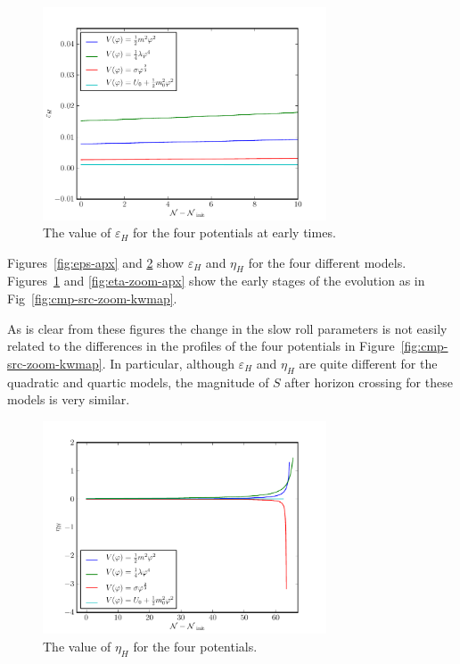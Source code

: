\begin{figure}
 \centering
 \includegraphics[width=0.75\textwidth]{numerical/graphs/epsilon_slowroll_zoom-large.pdf}
 \caption[Value of $\varepsilon_H$ for the Four Potentials at Early Times]{The value of
$\varepsilon_H$ for the four potentials at early times.}
 \label{fig:eps-zoom-apx}
\end{figure}

Figures~\ref{fig:eps-apx} and \ref{fig:eta-apx} show $\varepsilon_H$ and $\eta_H$ for the
four different models. Figures~\ref{fig:eps-zoom-apx} and
\ref{fig:eta-zoom-apx} show the early stages of the evolution as in
Fig~\ref{fig:cmp-src-zoom-kwmap}.

As is clear from these figures the change in the slow roll parameters is not easily related
to the differences in the profiles of the four potentials in Figure~\ref{fig:cmp-src-zoom-kwmap}. In
particular, although $\varepsilon_H$ and $\eta_H$ are quite different for the quadratic and quartic
models, the magnitude of $S$ after horizon crossing for these models is very similar.
\begin{figure}
 \centering
 \includegraphics[width=0.75\textwidth]{numerical/graphs/eta_slowroll-large.pdf}
 \caption[Value of $\eta_H$ for the Four Potentials]{The value of $\eta_H$ for the four
potentials.}
 \label{fig:eta-apx}
\end{figure}

